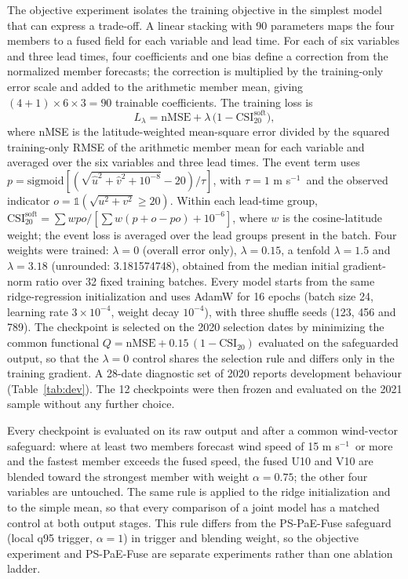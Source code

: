 \documentclass[12pt]{article}
\newcommand{\mps}{m s$^{-1}$}
\begin{document}
The objective experiment isolates the training objective in the simplest model that can express a trade-off. A linear stacking with 90 parameters maps the four members to a fused field for each variable and lead time. For each of six variables and three lead times, four coefficients and one bias define a correction from the normalized member forecasts; the correction is multiplied by the training-only error scale and added to the arithmetic member mean, giving $(4+1)\times6\times3=90$ trainable coefficients. The training loss is
\begin{equation}
L_{\lambda} = \mathrm{nMSE} + \lambda\,\bigl(1 - \mathrm{CSI}^{\mathrm{soft}}_{20}\bigr),
\label{eq:jointS}
\end{equation}
where nMSE is the latitude-weighted mean-square error divided by the squared training-only RMSE of the arithmetic member mean for each variable and averaged over the six variables and three lead times. The event term uses $p=\mathrm{sigmoid}[(\sqrt{\hat u^2+\hat v^2+10^{-8}}-20)/\tau]$, with $\tau=1$ \mps\ and the observed indicator $o=\mathbb{1}(\sqrt{u^2+v^2}\geq20)$. Within each lead-time group, $\mathrm{CSI}^{\mathrm{soft}}_{20}=\sum wp o/[\sum w(p+o-po)+10^{-6}]$, where $w$ is the cosine-latitude weight; the event loss is averaged over the lead groups present in the batch. Four weights were trained: $\lambda = 0$ (overall error only), $\lambda = 0.15$, a tenfold $\lambda = 1.5$ and $\lambda = 3.18$ (unrounded: 3.181574748), obtained from the median initial gradient-norm ratio over 32 fixed training batches. Every model starts from the same ridge-regression initialization and uses AdamW for 16 epochs (batch size 24, learning rate $3\times10^{-4}$, weight decay $10^{-4}$), with three shuffle seeds (123, 456 and 789). The checkpoint is selected on the 2020 selection dates by minimizing the common functional $Q = \mathrm{nMSE} + 0.15\,(1 - \mathrm{CSI}_{20})$ evaluated on the safeguarded output, so that the $\lambda = 0$ control shares the selection rule and differs only in the training gradient. A 28-date diagnostic set of 2020 reports development behaviour (Table~\ref{tab:dev}). The 12 checkpoints were then frozen and evaluated on the 2021 sample without any further choice.

Every checkpoint is evaluated on its raw output and after a common wind-vector safeguard: where at least two members forecast wind speed of 15 \mps\ or more and the fastest member exceeds the fused speed, the fused U10 and V10 are blended toward the strongest member with weight $\alpha = 0.75$; the other four variables are untouched. The same rule is applied to the ridge initialization and to the simple mean, so that every comparison of a joint model has a matched control at both output stages. This rule differs from the PS-PaE-Fuse safeguard (local q95 trigger, $\alpha = 1$) in trigger and blending weight, so the objective experiment and PS-PaE-Fuse are separate experiments rather than one ablation ladder.
\end{document}
